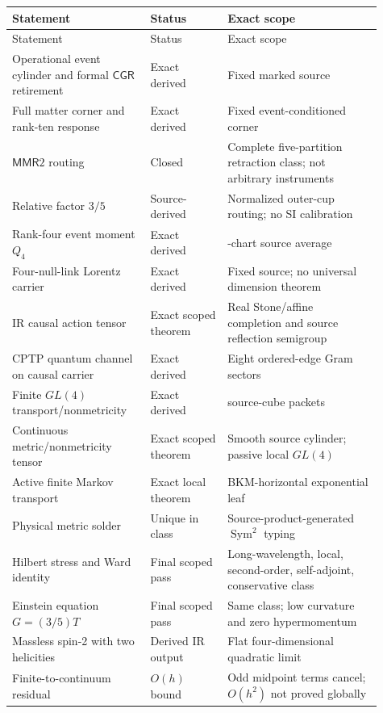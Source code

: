 \documentclass[11pt]{article}
\theoremstyle{definition}
\theoremstyle{remark}
\newcommand{\Sym}{\operatorname{Sym}}
\newcommand{\MMR}{\mathsf{MMR}}
\newcommand{\CGR}{\mathsf{CGR}}
\begin{document}
\begin{longtable}{>{\raggedright\arraybackslash}p{0.34\linewidth} >{\raggedright\arraybackslash}p{0.19\linewidth} >{\raggedright\arraybackslash}p{0.38\linewidth}}
\toprule
Statement & Status & Exact scope \\
\midrule
\endfirsthead
\toprule
Statement & Status & Exact scope \\
\midrule
\endhead
Operational event cylinder and formal $\CGR$ retirement & Exact derived & Fixed marked source \\
Full matter corner and rank-ten response & Exact derived & Fixed event-conditioned corner \\
$\MMR2$ routing & Closed & Complete five-partition retraction class; not arbitrary instruments \\
Relative factor $3/5$ & Source-derived & Normalized outer-cup routing; no SI calibration \\
Rank-four event moment $Q_4$ & Exact derived & 24-chart source average \\
Four-null-link Lorentz carrier & Exact derived & Fixed source; no universal dimension theorem \\
IR causal action tensor & Exact scoped theorem & Real Stone/affine completion and source reflection semigroup \\
CPTP quantum channel on causal carrier & Exact derived & Eight ordered-edge Gram sectors \\
Finite $GL(4)$ transport/nonmetricity & Exact derived & 48 source-cube packets \\
Continuous metric/nonmetricity tensor & Exact scoped theorem & Smooth source cylinder; passive local $GL(4)$ \\
Active finite Markov transport & Exact local theorem & BKM-horizontal exponential leaf \\
Physical metric solder & Unique in class & Source-product-generated $\Sym^2$ typing \\
Hilbert stress and Ward identity & Final scoped pass & Long-wavelength, local, second-order, self-adjoint, conservative class \\
Einstein equation $G=(3/5)T$ & Final scoped pass & Same class; low curvature and zero hypermomentum \\
Massless spin-2 with two helicities & Derived IR output & Flat four-dimensional quadratic limit \\
Finite-to-continuum residual & $O(h)$ bound & Odd midpoint terms cancel; $O(h^2)$ not proved globally \\

\end{longtable}
\end{document}

